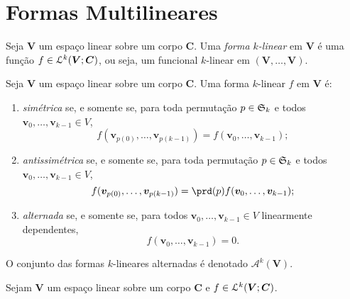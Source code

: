 \section{Formas Multilineares}

\begin{defi}
Seja $\bm V$ um espaço linear sobre um corpo $\bm C$. Uma \emph{forma $k$-linear} em $\bm V$ é uma função $f \in \mathcal{L}^k(\bm V;\bm C)$, ou seja, um funcional $k$-linear em $(\bm V,\ldots,\bm V)$.
\end{defi}

\begin{defi}
Seja $\bm V$ um espaço linear sobre um corpo $\bm C$. Uma forma $k$-linear $f$ em $\bm V$ é:
\begin{enumerate}
\item \emph{simétrica} se, e somente se, para toda permutação $p \in \mathfrak{S}_k$ e todos $\bm v_0,\ldots,\bm v_{k-1} \in V$,
	\begin{equation*}
	f(\bm v_{p(0)},\ldots,\bm v_{p(k-1)}) = f(\bm v_0,\ldots,\bm v_{k-1});
	\end{equation*}
\item \emph{antissimétrica} se, e somente se, para toda permutação $p \in \mathfrak{S}_k$ e todos $\bm v_0,\ldots,\bm v_{k-1} \in V$,
	\begin{equation*}
	f(\bm v_{p(0)},\ldots,\bm v_{p(k-1)}) = \prd(p) f(\bm v_0,\ldots,\bm v_{k-1});
	\end{equation*}
\item \emph{alternada} se, e somente se, para todos $\bm v_0,\ldots,\bm v_{k-1} \in V$ linearmente dependentes,
	\begin{equation*}
	f(\bm v_0,\ldots,\bm v_{k-1}) = 0.
	\end{equation*}
\end{enumerate}
O conjunto das formas $k$-lineares alternadas é denotado $\mathcal A^k(\bm V)$.
\end{defi}

\begin{prop}
Sejam $\bm V$ um espaço linear sobre um corpo $\bm C$ e $f \in \mathcal{L}^k(\bm V;\bm C)$.
\end{prop}

